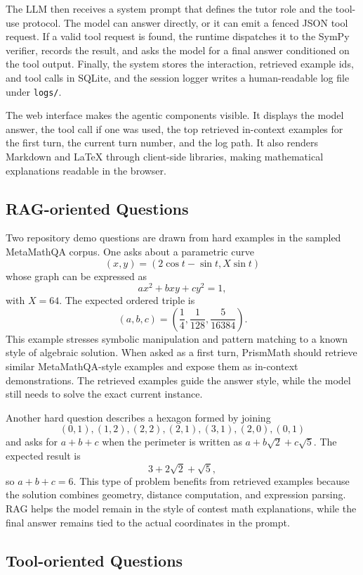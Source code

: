 The LLM then receives a system prompt that defines the tutor role and the tool-use protocol. The model can answer directly, or it can emit a fenced JSON tool request. If a valid tool request is found, the runtime dispatches it to the SymPy verifier, records the result, and asks the model for a final answer conditioned on the tool output. Finally, the system stores the interaction, retrieved example ids, and tool calls in SQLite, and the session logger writes a human-readable log file under \texttt{logs/}.

The web interface makes the agentic components visible. It displays the model answer, the tool call if one was used, the top retrieved in-context examples for the first turn, the current turn number, and the log path. It also renders Markdown and LaTeX through client-side libraries, making mathematical explanations readable in the browser.

\subsection{RAG-oriented Questions}

Two repository demo questions are drawn from hard examples in the sampled MetaMathQA corpus. One asks about a parametric curve
\[
    (x,y)=(2\cos t-\sin t, X\sin t)
\]
whose graph can be expressed as
\[
    ax^2+bxy+cy^2=1,
\]
with $X=64$. The expected ordered triple is
\[
    (a,b,c)=\left(\frac{1}{4},\frac{1}{128},\frac{5}{16384}\right).
\]
This example stresses symbolic manipulation and pattern matching to a known style of algebraic solution. When asked as a first turn, PrismMath should retrieve similar MetaMathQA-style examples and expose them as in-context demonstrations. The retrieved examples guide the answer style, while the model still needs to solve the exact current instance.

Another hard question describes a hexagon formed by joining
\[
(0,1),(1,2),(2,2),(2,1),(3,1),(2,0),(0,1)
\]
and asks for $a+b+c$ when the perimeter is written as $a+b\sqrt{2}+c\sqrt{5}$. The expected result is
\[
    3+2\sqrt{2}+\sqrt{5},
\]
so $a+b+c=6$. This type of problem benefits from retrieved examples because the solution combines geometry, distance computation, and expression parsing. RAG helps the model remain in the style of contest math explanations, while the final answer remains tied to the actual coordinates in the prompt.

\subsection{Tool-oriented Questions}

